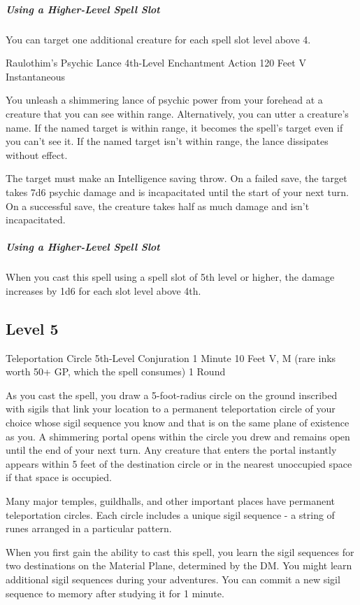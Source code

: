 \documentclass[letterpaper,openany,oneside,twocolumn]{book}
\begin{document}
\subparagraph*{Using a Higher-Level Spell Slot} You can target one additional creature for each spell slot level above 4.

\DndSpellHeader
  {Raulothim's Psychic Lance}
  {4th-Level Enchantment}
  {Action}
  {120 Feet}
  {V}
  {Instantaneous}
  
You unleash a shimmering lance of psychic power from your forehead at a creature that you can see within range. Alternatively, you can utter a creature's name. If the named target is within range, it becomes the spell's target even if you can't see it. If the named target isn't within range, the lance dissipates without effect.

The target must make an Intelligence saving throw. On a failed save, the target takes 7d6 psychic damage and is incapacitated until the start of your next turn. On a successful save, the creature takes half as much damage and isn't incapacitated.

\subparagraph*{Using a Higher-Level Spell Slot} When you cast this spell using a spell slot of 5th level or higher, the damage increases by 1d6 for each slot level above 4th.

\subsection*{Level 5}

\DndSpellHeader
  {Teleportation Circle}
  {5th-Level Conjuration}
  {1 Minute}
  {10 Feet}
  {V, M (rare inks worth 50+ GP, which the spell consumes)}
  {1 Round}
  
As you cast the spell, you draw a 5-foot-radius circle on the ground inscribed with sigils that link your location to a permanent teleportation circle of your choice whose sigil sequence you know and that is on the same plane of existence as you. A shimmering portal opens within the circle you drew and remains open until the end of your next turn. Any creature that enters the portal instantly appears within 5 feet of the destination circle or in the nearest unoccupied space if that space is occupied.

Many major temples, guildhalls, and other important places have permanent teleportation circles. Each circle includes a unique sigil sequence - a string of runes arranged in a particular pattern.

When you first gain the ability to cast this spell, you learn the sigil sequences for two destinations on the Material Plane, determined by the DM. You might learn additional sigil sequences during your adventures. You can commit a new sigil sequence to memory after studying it for 1 minute.
\end{document}
